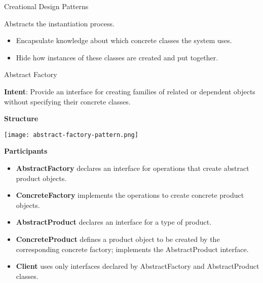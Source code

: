 \documentclass{beamer}
\author[Chris Simpkins] 
{Christopher Simpkins \\\texttt{chris.simpkins@gatech.edu}}
\institute[Georgia Tech] %
\date[CS 1331]{}
\begin{document}
\begin{frame}
  \titlepage
\end{frame}

\begin{frame}[fragile]{Creational Design Patterns}


Abstracts the instantiation process.
\begin{itemize}
\item Encapsulate knowledge about which concrete classes the system uses.
\item Hide how instances of these classes are created and put together.
\end{itemize}


\end{frame}

\begin{frame}[fragile]{Abstract Factory}


{\bf Intent}: Provide an interface for creating families of related or dependent objects without specifying their concrete classes.

{\bf Structure}
\vspace{-.15in}
\begin{center}
\texttt{[image: abstract-factory-pattern.png]}\\
\end{center}
\vspace{-.225in}
{\bf Participants}
\begin{itemize}
\item {\bf AbstractFactory} declares an interface for operations that create abstract product objects.
\item {\bf ConcreteFactory} implements the operations to create concrete product objects.
\item {\bf AbstractProduct} declares an interface for a type of product.
\item {\bf ConcreteProduct} defines a product object to be created by the corresponding concrete factory; implements the AbstractProduct interface.
\item {\bf Client} uses only interfaces declared by AbstractFactory and AbstractProduct classes.
\end{itemize}


\end{frame}
\end{document}
